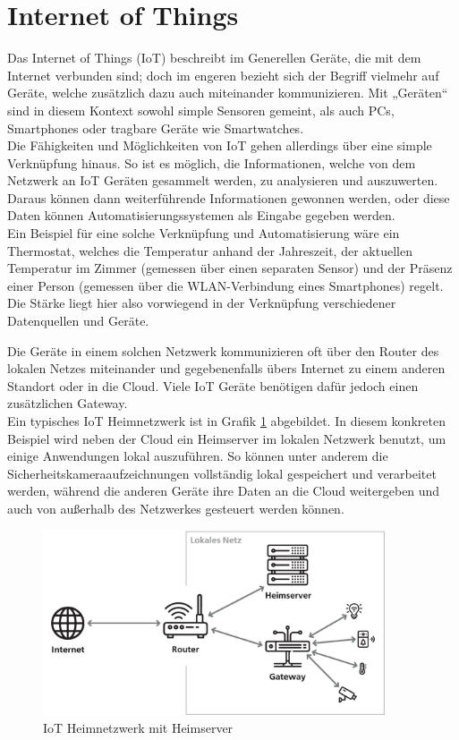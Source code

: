 \section{Internet of Things}
\label{sec:iot}

Das Internet of Things (IoT) beschreibt im Generellen Geräte, die mit dem Internet verbunden sind; doch im engeren bezieht sich der Begriff vielmehr auf Geräte, welche zusätzlich dazu auch miteinander kommunizieren. Mit „Geräten“ sind in diesem Kontext sowohl simple Sensoren gemeint, als auch PCs, Smartphones oder tragbare Geräte wie Smartwatches.\\
Die Fähigkeiten und Möglichkeiten von IoT gehen allerdings über eine simple Verknüpfung hinaus. So ist es möglich, die Informationen, welche von dem Netzwerk an IoT Geräten gesammelt werden, zu analysieren und auszuwerten. Daraus können dann weiterführende Informationen gewonnen werden, oder diese Daten können Automatisierungssystemen als Eingabe gegeben werden.\\
Ein Beispiel für eine solche Verknüpfung und Automatisierung wäre ein Thermostat, welches die Temperatur anhand der Jahreszeit, der aktuellen Temperatur im Zimmer (gemessen über einen separaten Sensor) und der Präsenz einer Person (gemessen über die WLAN-Verbindung eines Smartphones) regelt. Die Stärke liegt hier also vorwiegend in der Verknüpfung verschiedener Datenquellen und Geräte.

Die Geräte in einem solchen Netzwerk kommunizieren oft über den Router des lokalen Netzes miteinander und gegebenenfalls übers Internet zu einem anderen Standort oder in die Cloud. Viele IoT Geräte benötigen dafür jedoch einen zusätzlichen Gateway.\\
Ein typisches IoT Heimnetzwerk ist in Grafik \ref{fig:IoT_Netzwerk} abgebildet. In diesem konkreten Beispiel wird neben der Cloud ein Heimserver im lokalen Netzwerk benutzt, um einige Anwendungen lokal auszuführen. So können unter anderem die Sicherheitskameraaufzeichnungen vollständig lokal gespeichert und verarbeitet werden, während die anderen Geräte ihre Daten an die Cloud weitergeben und auch von außerhalb des Netzwerkes gesteuert werden können.
%
\begin{figure}[htbp]
	\centering\includegraphics[width=0.9\textwidth]{images/02/IoT_Netzwerk.pdf}
    \caption{IoT Heimnetzwerk mit Heimserver}
    \label{fig:IoT_Netzwerk}
\end{figure}

